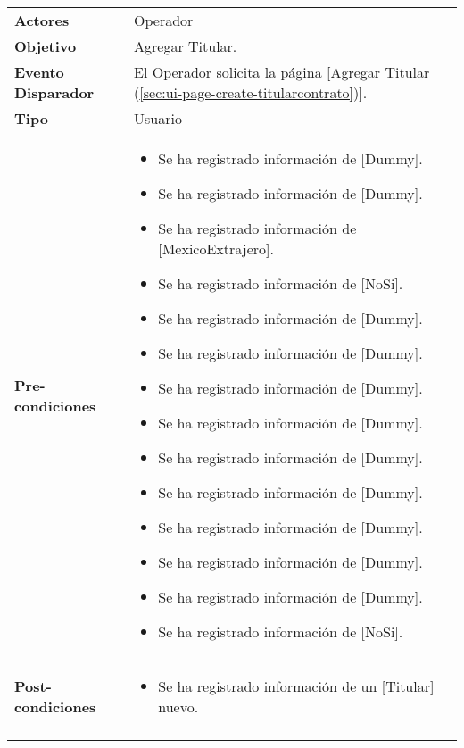 	\begin{tabular}{ p{3.5cm} p{11.5cm} }
		\textbf{Actores} & Operador\\
		\textbf{Objetivo} & Agregar Titular.\\
		\textbf{Evento Disparador} & El Operador solicita la p\'agina [Agregar Titular (\ref{sec:ui-page-create-titularcontrato})].\\
		\textbf{Tipo} & Usuario\\
		\textbf{Pre-condiciones} &
			\begin{minipage}[t]{0.6\textwidth}
			\begin{itemize}[noitemsep,nolistsep]
			\setlength{\itemindent}{-.5cm}
				\item Se ha registrado informaci\'on de [Dummy].
				\item Se ha registrado informaci\'on de [Dummy].
				\item Se ha registrado informaci\'on de [MexicoExtrajero].
				\item Se ha registrado informaci\'on de [NoSi].
				\item Se ha registrado informaci\'on de [Dummy].
				\item Se ha registrado informaci\'on de [Dummy].
				\item Se ha registrado informaci\'on de [Dummy].
				\item Se ha registrado informaci\'on de [Dummy].
				\item Se ha registrado informaci\'on de [Dummy].
				\item Se ha registrado informaci\'on de [Dummy].
				\item Se ha registrado informaci\'on de [Dummy].
				\item Se ha registrado informaci\'on de [Dummy].
				\item Se ha registrado informaci\'on de [Dummy].
				\item Se ha registrado informaci\'on de [NoSi].
			\end{itemize}
			\end{minipage} \\
		\textbf{Post-condiciones} &
			\begin{minipage}[t]{0.6\textwidth}
			\begin{itemize}[noitemsep,nolistsep]
			\setlength{\itemindent}{-.5cm}
				\item Se ha registrado informaci\'on de un [Titular] nuevo.
			\end{itemize}
			\end{minipage} \\
		\\
	\end{tabular}
	
